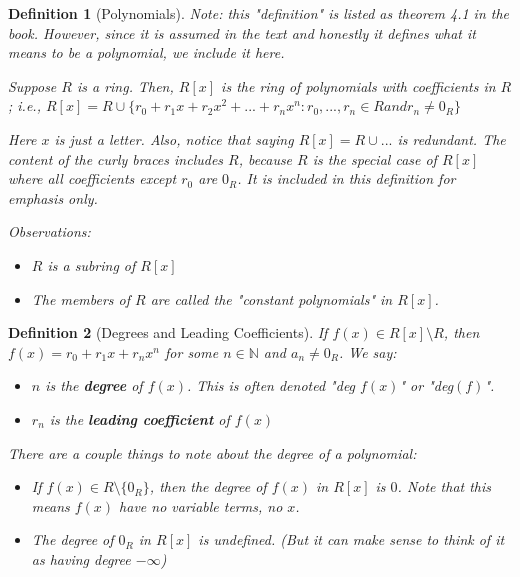 \documentclass{article}
\theoremstyle{break}
\newtheorem{definition}{Definition}[subsection]
\newcommand*{\N}{\mathbb{N}}
\begin{document}
\begin{definition}[Polynomials]
  \textit{Note: this "definition" is listed as theorem 4.1 in the book. 
  However, since it is assumed in the text and honestly it defines what it
  means to be a polynomial, we include it here.}

  Suppose $R$ is a ring. Then, $R[x]$ is the ring of polynomials with
  coefficients in $R$; i.e., $R[x] = R \cup \{r_0 + r_1 x + r_2 x^2 + ... + r_n
  x^n : r_0, ..., r_n \in R and r_n \neq 0_R \}$

  Here $x$ is just a letter. Also, notice that saying $R[x] = R \cup {...}$ is
  redundant. The content of the curly braces includes $R$, because $R$ is the
  special case of $R[x]$ where all coefficients except $r_0$ are $0_R$. It is
  included in this definition for emphasis only.

  Observations:
  \begin{itemize}
    \item $R$ is a subring of $R[x]$
    \item The members of $R$ are called the "constant polynomials" in $R[x]$. 
  \end{itemize}
\end{definition}

\begin{definition}[Degrees and Leading Coefficients]
  If $f(x) \in R[x] \setminus R$, then $f(x) = r_0 + r_1x + r_n x^n$ for some
  $n \in \N$ and $a_n \neq 0_R$. We say:

  \begin{itemize}
    \item $n$ is the \textbf{degree} of $f(x)$. This is often denoted
    "deg $f(x)$" or "deg$(f)$".
    \item $r_n$ is the \textbf{leading coefficient} of $f(x)$
  \end{itemize}

  There are a couple things to note about the degree of a polynomial:
  \begin{itemize}
    \item If $f(x) \in R \setminus \{ 0_R \}$, then the degree of $f(x)$ in
    $R[x]$ is $0$. Note that this means $f(x)$ have no variable terms, no $x$. 
    \item The degree of $0_R$ in $R[x]$ is undefined. (But it can make sense to
    think of it as having degree $-\infty$)
  \end{itemize}
\end{definition}

\end{document}
